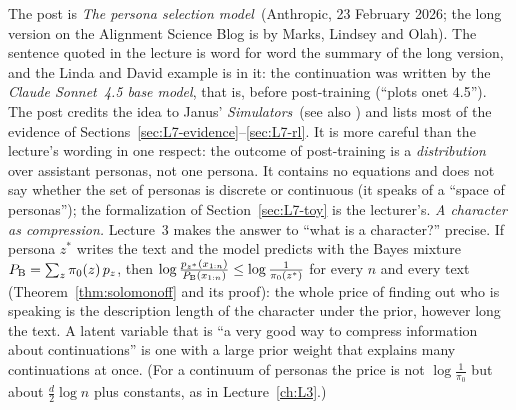 \begin{beyond}\label{box:L7-psm-src}
The post is \emph{The persona selection model}\,\citep{anthropic2026persona} (Anthropic, 23 February 2026; the long version on the Alignment Science Blog is by Marks, Lindsey and Olah). The sentence quoted in the lecture is word for word the summary of the long version, and the Linda and David example is in it: the continuation was written by the \emph{Claude Sonnet~4.5 base model}, that is, before post-training (``plots onet 4.5''). The post credits the idea to Janus' \emph{Simulators}\,\citep{janus2022} (see also \citealp{shanahan2023}) and lists most of the evidence of Sections~\ref{sec:L7-evidence}--\ref{sec:L7-rl}. It is more careful than the lecture's wording in one respect: the outcome of post-training is a \emph{distribution} over assistant personas, not one persona. It contains no equations and does not say whether the set of personas is discrete or continuous (it speaks of a ``space of personas''); the formalization of Section~\ref{sec:L7-toy} is the lecturer's.
\emph{A character as compression.} Lecture~3 makes the answer to ``what is a character?'' precise. If persona $z^*$ writes the text and the model predicts with the Bayes mixture $P_{\mathrm{B}}=\sum_z\pi_0(z)\,p_z$, then $\log\frac{p_{z^*}(x_{1:n})}{P_{\mathrm{B}}(x_{1:n})}\le\log\frac1{\pi_0(z^*)}$ for every $n$ and every text (Theorem~\ref{thm:solomonoff} and its proof): the whole price of finding out who is speaking is the description length of the character under the prior, however long the text. A latent variable that is ``a very good way to compress information about continuations'' is one with a large prior weight that explains many continuations at once. (For a continuum of personas the price is not $\log\frac1{\pi_0}$ but about $\frac d2\log n$ plus constants, as in Lecture~\ref{ch:L3}.)
\end{beyond}



